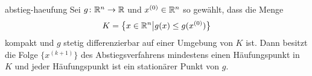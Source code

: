 \begin{Satz}{abstieg-haeufung}
  Sei $g\colon \mathbb R^n\to \mathbb R$ und $x^{(0)} \in\mathbb R^n$ so gewählt, dass die Menge
  \begin{gather}
    K = \bigl\{x\in\mathbb R^n \big| g(x) \le g(x^{(0)}) \bigr\}
  \end{gather}
  kompakt und $g$ stetig differenzierbar auf einer Umgebung von $K$
  ist. Dann besitzt die Folge $\{x^{(k+1)}\}$ des Abstiegsverfahrens
  mindestens einen Häufungspunkt in $K$ und jeder Häufungspunkt ist
  ein stationärer Punkt von $g$.
\end{Satz}



